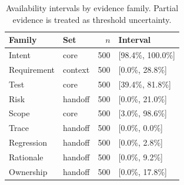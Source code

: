 \begin{table}[t]
\centering
\caption{Availability intervals by evidence family. Partial evidence is treated as threshold uncertainty.}
\label{tab:availability-intervals}
\footnotesize
\begin{tabular}{@{}L{0.25\columnwidth}L{0.17\columnwidth}rL{0.31\columnwidth}@{}}
\toprule
Family & Set & $n$ & Interval \\
\midrule
Intent & core & 500 & [98.4\%, 100.0\%] \\
Requirement & context & 500 & [0.0\%, 28.8\%] \\
Test & core & 500 & [39.4\%, 81.8\%] \\
Risk & handoff & 500 & [0.0\%, 21.0\%] \\
Scope & core & 500 & [3.0\%, 98.6\%] \\
Trace & handoff & 500 & [0.0\%, 0.0\%] \\
Regression & handoff & 500 & [0.0\%, 2.8\%] \\
Rationale & handoff & 500 & [0.0\%, 9.2\%] \\
Ownership & handoff & 500 & [0.0\%, 17.8\%] \\
\bottomrule
\end{tabular}
\end{table}
